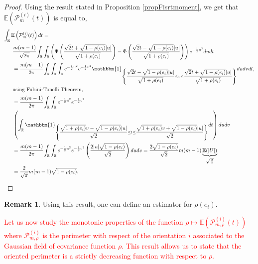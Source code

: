 \documentclass[12pt]{article}
\theoremstyle{Theorem}
\theoremstyle{definition}
\newtheorem{remark}{Remark}
\begin{document}
\begin{proof}
Using the result stated in Proposition \ref{propFisrtmoment}, we get that $\mathbb{E}\left(\mathcal{P}^{\scriptscriptstyle  (i)}_{m}(t) \right)$ is equal to,
{\small
\begin{align*}
\int_{\mathbb{R}} \mathbb{E}\left(\mathcal{P}^{(i)}_{m}(t)\right) dt & = \\
& \hspace{-2cm}\cfrac{m(m-1)}{\sqrt{2\pi}} \int_{\mathbb{R}}\int_{\mathbb{R}} \left(\Phi\left(\dfrac{\sqrt{2}t + \sqrt{1-\rho(e_i)}|u|}{\sqrt{1+\rho(e_i)}}\right) - \Phi\left(\dfrac{\sqrt{2}t - \sqrt{1-\rho(e_i)}|u|}{\sqrt{1+\rho(e_i)}}\right)\right)e^{-\frac{1}{2}u^2}dudt \\
& \hspace{-2cm}=\cfrac{m(m-1)}{2\pi} \int_{\mathbb{R}}\int_{\mathbb{R}}\int_{\mathbb{R}} e^{-\frac{1}{2}u^2}e^{-\frac{1}{2}v^2} \mathbbm{1}_{\left\{\dfrac{\sqrt{2}t - \sqrt{1-\rho(e_i)}|u|}{\sqrt{1+\rho(e_i)}}\leq v \leq\dfrac{\sqrt{2}t + \sqrt{1-\rho(e_i)}|u|}{\sqrt{1+\rho(e_i)}}\right\}} du dv dt ,\\
& \hspace{-2cm}\text{using Fubini-Tonelli Theorem,} \\
& \hspace{-2cm}= \cfrac{m(m-1)}{2\pi}\int_{\mathbb{R}}\int_{\mathbb{R}} e^{-\frac{1}{2}u^2}e^{-\frac{1}{2}v^2} \\
& \hspace{-2cm} \left(\int_{\mathbb{R}} \mathbbm{1}_{\left\{\dfrac{\sqrt{1+\rho(e_i)}v - \sqrt{1-\rho(e_i)}|u|}{\sqrt{2}}\leq t\leq\dfrac{\sqrt{1+\rho(e_i)}v + \sqrt{1-\rho(e_i)}|u|}{\sqrt{2}}\right\}} dt\right) du dv \\
& \hspace{-2cm}= \cfrac{m(m-1)}{2\pi} \int_{\mathbb{R}}\int_{\mathbb{R}} e^{-\frac{1}{2}u^2}e^{-\frac{1}{2}v^2}\left(\dfrac{2|u|\sqrt{1-\rho(e_i)}}{\sqrt{2}}\right)dudv = \frac{2\sqrt{1-\rho(e_i)}}{\sqrt{2}} m(m-1)\underbrace{\mathbb{E}(|U|)}_{\sqrt{\frac{2}{\pi}}}\\
&\hspace{-2cm}=\frac{2}{\sqrt{\pi}}m(m-1)\sqrt{1-\rho(e_i)}.
\end{align*}
}
\end{proof}
\begin{remark}
Using this result, one can define an estimator for $\rho(e_i)$. 
\end{remark}
\textcolor{red}{Let us now study the monotonic properties of the function $\rho \mapsto \mathbb{E}\left(\mathcal{P}^{\scriptscriptstyle (i)}_{m, \rho}(t)\right)$ where $\mathcal{P}^{\scriptscriptstyle (i)}_{m, \rho}$ is the perimeter with respect of the orientation $i$ associated to the Gaussian field of covariance function $\rho$. This result allows us to state that the oriented perimeter is a strictly decreasing function with respect to $\rho$. }
\end{document}
